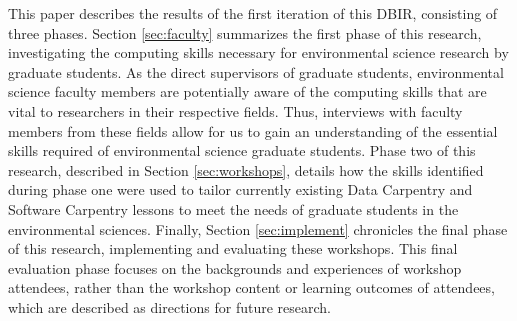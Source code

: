 \documentclass[12pt]{article}
\begin{document}
\quad This paper describes the results of the first iteration of this DBIR, 
consisting of three phases. Section \ref{sec:faculty} summarizes the first phase
of this research, investigating the computing skills necessary for environmental
science research by graduate students. As the direct supervisors of graduate
students, environmental science faculty members are potentially aware of the
computing skills that are vital to researchers in their respective fields. Thus,
interviews with faculty members from these fields allow for us to gain an
understanding of the essential skills required of environmental science graduate
students. Phase two of this research, described in Section \ref{sec:workshops}, 
details how the skills identified during phase one were used to tailor
currently existing Data Carpentry \citep{data-carpentry} and Software Carpentry
\citep{software-carpentry} lessons to meet the needs of graduate students in the
environmental sciences. Finally, Section \ref{sec:implement} chronicles the
final phase of this research, implementing and evaluating these workshops. This
final evaluation phase focuses on the backgrounds and experiences of workshop
attendees, rather than the workshop content or learning outcomes of attendees,
which are described as directions for future research. 

% 
% 
\end{document}

